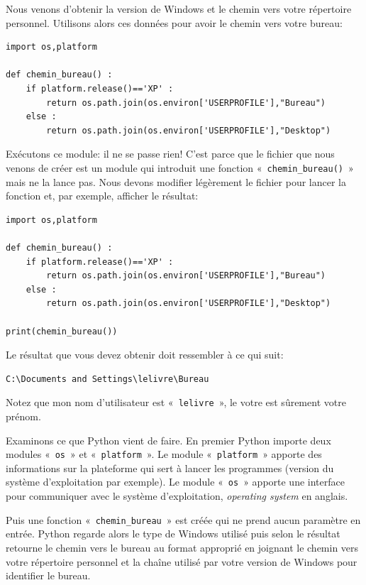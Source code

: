 Nous venons d'obtenir la version de Windows et le chemin vers votre répertoire personnel.
Utilisons alors ces données pour avoir le chemin vers votre bureau:

\begin{Verbatim}[frame=single,rulecolor=\color{mbleu}, label=à taper]
import os,platform

def chemin_bureau() :
    if platform.release()=='XP' :
        return os.path.join(os.environ['USERPROFILE'],"Bureau")
    else :
        return os.path.join(os.environ['USERPROFILE'],"Desktop")
\end{Verbatim}

Exécutons ce module: il ne se passe rien! C'est parce que le fichier que nous venons de créer est un module qui introduit une fonction « \texttt{chemin\_bureau()} » mais ne la lance pas. Nous devons modifier légèrement le fichier pour lancer la fonction et, par exemple, afficher le résultat:

\begin{Verbatim}[frame=single,rulecolor=\color{mbleu}, label=à taper]
import os,platform

def chemin_bureau() :
    if platform.release()=='XP' :
        return os.path.join(os.environ['USERPROFILE'],"Bureau")
    else :
        return os.path.join(os.environ['USERPROFILE'],"Desktop")
    
print(chemin_bureau())
\end{Verbatim}

Le résultat que vous devez obtenir doit ressembler à ce qui suit:

\begin{Verbatim}[frame=single,rulecolor=\color{gray}, label=résultat]
C:\Documents and Settings\lelivre\Bureau
\end{Verbatim}

Notez que mon nom d'utilisateur est « \texttt{lelivre} », le votre est sûrement votre prénom.

Examinons ce que Python vient de faire. En premier Python importe deux modules « \texttt{os} » et « \texttt{platform} ». Le module « \texttt{platform} » apporte des informations sur la plateforme qui sert à lancer les programmes (version du système d'exploitation par exemple). Le module « \texttt{os} » apporte une interface pour communiquer avec le système d'exploitation, \emph{operating system} en anglais.

Puis une fonction « \texttt{chemin\_bureau} » est créée qui ne prend aucun paramètre en entrée. Python regarde alors le type de Windows utilisé puis selon le résultat retourne le chemin vers le bureau au format approprié en joignant le chemin vers votre répertoire personnel et la chaîne utilisé par votre version de Windows pour identifier le bureau.

